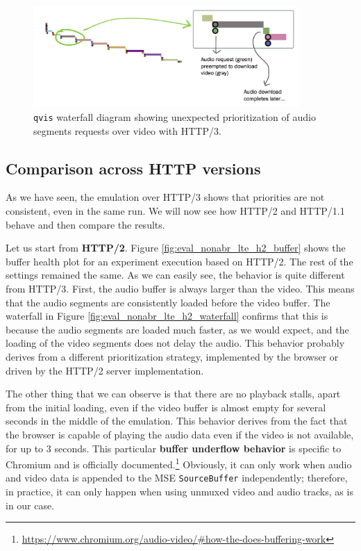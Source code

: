 \begin{figure}[h]
    \centering
    \includegraphics[width=0.9\textwidth]{res/eval_nonabr_qvis2.png}
    \caption{\texttt{qvis} waterfall diagram showing unexpected prioritization of audio segments requests over video with HTTP/3.}
    \label{fig:eval_noabr_qvis2}
\end{figure}

\subsection{Comparison across HTTP versions}
\label{sec:eval/non-abr/http-versions}

As we have seen, the emulation over HTTP/3 shows that priorities are not consistent, even in the same run. We will now see how HTTP/2 and HTTP/1.1 behave and then compare the results.

Let us start from \textbf{HTTP/2}. Figure \ref{fig:eval_nonabr_lte_h2_buffer} shows the buffer health plot for an experiment execution based on HTTP/2. The rest of the settings remained the same. As we can easily see, the behavior is quite different from HTTP/3. First, the audio buffer is always larger than the video. This means that the audio segments are consistently loaded before the video buffer. The waterfall in Figure \ref{fig:eval_nonabr_lte_h2_waterfall} confirms that this is because the audio segments are loaded much faster, as we would expect, and the loading of the video segments does not delay the audio. This behavior probably derives from a different prioritization strategy, implemented by the browser or driven by the HTTP/2 server implementation.

The other thing that we can observe is that there are no playback stalls, apart from the initial loading, even if the video buffer is almost empty for several seconds in the middle of the emulation. This behavior derives from the fact that the browser is capable of playing the audio data even if the video is not available, for up to 3 seconds. This particular \textbf{buffer underflow behavior} is specific to Chromium and is officially documented.\footnote{\url{https://www.chromium.org/audio-video/\#how-the-does-buffering-work}} Obviously, it can only work when audio and video data is appended to the MSE \texttt{SourceBuffer} independently; therefore, in practice, it can only happen when using unmuxed video and audio tracks, as is in our case.

